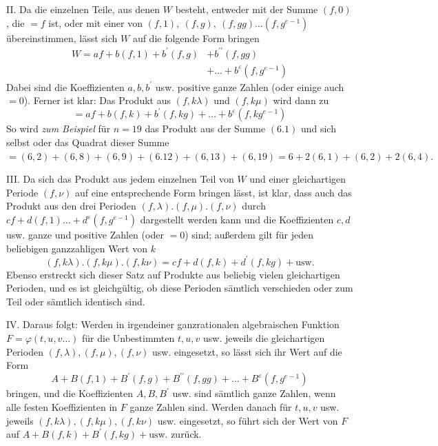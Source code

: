 II. Da die einzelnen Teile, aus denen \(W\) besteht, entweder mit der Summe \((f,\allowbreak 0)\), die \(=f\) ist, oder mit einer von \((f,\allowbreak 1),\allowbreak \ (f,\allowbreak g),\allowbreak \ (f,\allowbreak gg)\ldots(f,\allowbreak g^{e-1})\) übereinstimmen, lässt sich \(W\) auf die folgende Form bringen \[\begin{aligned}
W=af+b(f,1)+b^{\prime}(f,g)&+b^{\prime\prime}(f,gg)\\
&+\ldots+b^\varepsilon(f,g^{e-1})
\end{aligned}\] Dabei sind die Koeffizienten \(a,\allowbreak b,\allowbreak b^{\prime}\) usw. positive ganze Zahlen (oder einige auch \(=0\)). Ferner ist klar: Das Produkt aus \((f,\allowbreak k\lambda)\) und \((f,\allowbreak k\mu)\) wird dann zu \[=af+b(f,k)+b^{\prime}(f,kg)+\ldots+b^\varepsilon(f,kg^{e-1})\] So wird \textit{zum Beispiel} für \(n=19\) das Produkt aus der Summe \((6.1)\) und sich selbst oder das Quadrat dieser Summe \(=(6,\allowbreak 2)+(6,\allowbreak 8)+(6,\allowbreak 9)+(6.12)+(6,\allowbreak 13)+(6,\allowbreak 19)=6+2(6,\allowbreak 1)+(6,\allowbreak 2)+2(6,\allowbreak 4).\)

III. Da sich das Produkt aus jedem einzelnen Teil von \(W\) und einer gleichartigen Periode \((f,\allowbreak \nu)\) auf eine entsprechende Form bringen lässt, ist klar, dass auch das Produkt aus den drei Perioden \((f,\allowbreak \lambda).(f,\allowbreak \mu).(f,\allowbreak \nu)\) durch \(cf+d(f,\allowbreak 1)\ldots+d^\varepsilon(f,\allowbreak g^{e-1})\) dargestellt werden kann und die Koeffizienten \(c,\allowbreak d\) usw. ganze und positive Zahlen (oder \(=0\)) sind; außerdem gilt für jeden beliebigen ganzzahligen Wert von \(k\) \[(f,k\lambda).(f,k\mu).(f,k\nu)=cf+d(f,k)+d^{\prime}(f,kg)+\text{usw.}\] Ebenso erstreckt sich dieser Satz auf Produkte aus beliebig vielen gleichartigen Perioden, und es ist gleichgültig, ob diese Perioden sämtlich verschieden oder zum Teil oder sämtlich identisch sind.

IV. Daraus folgt: Werden in irgendeiner ganzrationalen algebraischen Funktion \(F=\varphi(t,\allowbreak u,\allowbreak v\ldots)\) für die Unbestimmten \(t,\allowbreak u,\allowbreak v\) usw. jeweils die gleichartigen Perioden \((f,\allowbreak \lambda),\allowbreak (f,\allowbreak \mu),\allowbreak (f,\allowbreak \nu)\) usw. eingesetzt, so lässt sich ihr Wert auf die Form \[A+B(f,1)+B^{\prime}(f,g)+B^{\prime\prime}(f,gg)+\ldots+B^\varepsilon(f,g^{e-1})\] bringen, und die Koeffizienten \(A,\allowbreak B,\allowbreak B^{\prime}\) usw. sind sämtlich ganze Zahlen, wenn alle festen Koeffizienten in \(F\) ganze Zahlen sind. Werden danach für \(t,\allowbreak u,\allowbreak v\) usw. jeweils
\((f,\allowbreak k\lambda),\allowbreak (f,\allowbreak k\mu),\allowbreak (f,\allowbreak k\nu)\) usw. eingesetzt, so führt sich der Wert von \(F\) auf \(A+B(f,\allowbreak k)+B^{\prime}(f,\allowbreak kg)+\text{usw.}\) zurück.

